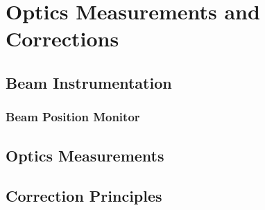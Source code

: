 \chapter{Optics Measurements and Corrections}
\thumbforchapter{}
\chaptertoc{}

\section{Beam Instrumentation}


\subsection{Beam Position Monitor}

\lipsum[1-2]

\section{Optics Measurements}




\section{Correction Principles}

